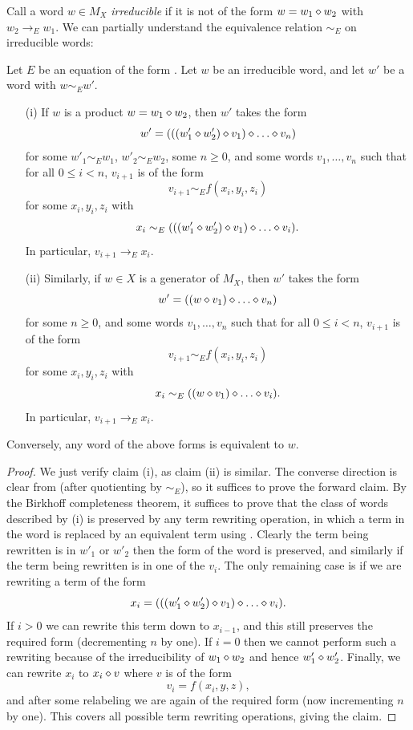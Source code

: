 Call a word $w \in M_X$ \emph{irreducible} if it is not of the form $w = w_1 \diamond w_2$ with $w_2 \to_E w_1$.  We can partially understand the equivalence relation $\sim_E$ on irreducible words:

\begin{theorem}\label{irred-desc}  Let $E$ be an equation of the form .  Let $w$ be an irreducible word, and let $w'$ be a word with $w \sim_E w'$.
  \begin{itemize}
    \item[(i)] If $w$ is a product $w = w_1 \diamond w_2$, then $w'$ takes the form
$$ w' = (((w'_1 \op w'_2) \op v_1) \op \dots \op v_n)$$
for some $w'_1 \sim_E w_1$, $w'_2 \sim_E w_2$, some $n \geq 0$, and some words $v_1, \dots, v_n$ such that for all $0 \leq i < n$, $v_{i+1}$ is of the form
$$ v_{i+1} \sim_E f(x_i,y_i,z_i)$$
for some $x_i, y_i, z_i$ with
$$ x_i \sim_E (((w'_1 \op w'_2) \op v_1) \op \dots \op v_i).$$
In particular, $v_{i+1} \to_E x_i$.
  \item[(ii)] Similarly, if $w \in X$ is a generator of $M_X$, then $w'$ takes the form
$$ w' = ((w \op v_1) \op \dots \op v_n)$$
for some $n \geq 0$, and some words $v_1, \dots, v_n$ such that for all $0 \leq i < n$, $v_{i+1}$ is of the form
$$ v_{i+1} \sim_E f(x_i,y_i,z_i)$$
for some $x_i, y_i, z_i$ with
$$ x_i \sim_E ((w \op v_1) \op \dots \op v_i).$$
In particular, $v_{i+1} \to_E x_i$.
\end{itemize}
Conversely, any word of the above forms is equivalent to $w$.
\end{theorem}

\begin{proof}  We just verify claim (i), as claim (ii) is similar.  The converse direction is clear from  (after quotienting by $\sim_E$), so it suffices to prove the forward claim. By the Birkhoff completeness theorem, it suffices to prove that the class of words described by (i) is preserved by any term rewriting operation, in which a term in the word is replaced by an equivalent term using .  Clearly the term being rewritten is in $w'_1$ or $w'_2$ then the form of the word is preserved, and similarly if the term being rewritten is in one of the $v_i$.  The only remaining case is if we are rewriting a term of the form
$$ x_i = (((w'_1 \op w'_2) \op v_1) \op \dots \op v_i).$$
If $i>0$ we can rewrite this term down to $x_{i-1}$, and this still preserves the required form (decrementing $n$ by one).  If $i=0$ then we cannot perform such a rewriting because of the irreducibility of $w_1 \diamond w_2$ and hence $w'_1 \diamond w'_2$.  Finally, we can rewrite $x_i$ to $x_i \diamond v$ where $v$ is of the form
$$ v_i = f(x_i,y,z),$$
and after some relabeling we are again of the required form (now incrementing $n$ by one). This covers all possible term rewriting operations, giving the claim.
\end{proof}

